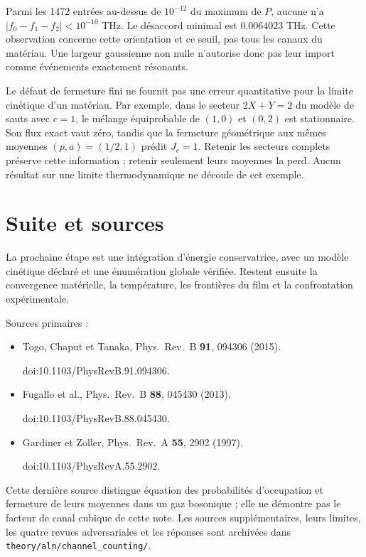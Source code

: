 \documentclass[11pt,a4paper]{article}
\begin{document}
Parmi les 1472 entrées au-dessus de $10^{-12}$ du maximum de $P$,
aucune n'a $|f_0-f_1-f_2|<10^{-10}$ THz. Le désaccord minimal est
$0.0064023$ THz. Cette observation concerne cette orientation et ce seuil,
pas tous les canaux du matériau. Une largeur gaussienne non nulle
n'autorise donc pas leur import comme événements exactement résonants.

Le défaut de fermeture fini ne fournit pas une erreur quantitative
pour la limite cinétique d'un matériau. Par exemple, dans le secteur
$2X+Y=2$ du modèle de sauts avec $c=1$, le mélange équiprobable
de $(1,0)$ et $(0,2)$ est stationnaire. Son flux exact vaut zéro,
tandis que la fermeture géométrique aux mêmes moyennes
$(p,a)=(1/2,1)$ prédit $J_e=1$. Retenir les secteurs complets
préserve cette information ; retenir seulement leurs moyennes la perd.
Aucun résultat sur une limite thermodynamique ne découle de cet exemple.

\section{Suite et sources}
La prochaine étape est une intégration d'énergie conservatrice,
avec un modèle cinétique déclaré et une énumération globale vérifiée.
Restent ensuite la convergence matérielle, la température, les frontières
du film et la confrontation expérimentale.

Sources primaires :
\begin{itemize}
\item Togo, Chaput et Tanaka, Phys.\ Rev.\ B \textbf{91}, 094306 (2015).
\par doi:10.1103/PhysRevB.91.094306.
\item Fugallo et al., Phys.\ Rev.\ B \textbf{88}, 045430 (2013).
\par doi:10.1103/PhysRevB.88.045430.
\item Gardiner et Zoller, Phys.\ Rev.\ A \textbf{55}, 2902 (1997).
\par doi:10.1103/PhysRevA.55.2902.
\end{itemize}
Cette dernière source distingue équation des probabilités d'occupation
et fermeture de leurs moyennes dans un gaz bosonique ; elle ne démontre
pas le facteur de canal cubique de cette note.
Les sources supplémentaires, leurs limites, les quatre revues adversariales
et les réponses sont archivées dans
\texttt{theory/aln/channel\_counting/}.
\end{document}
